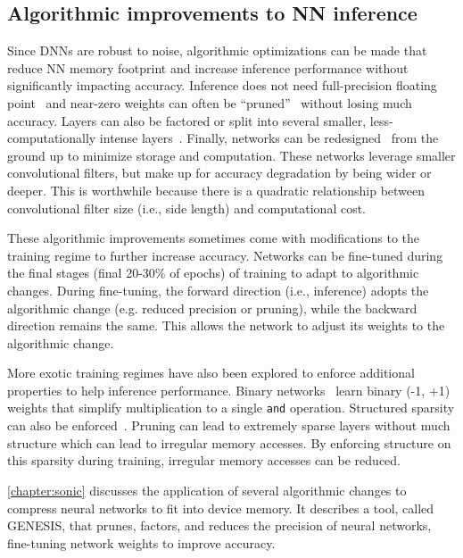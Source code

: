 \subsection{Algorithmic improvements to NN inference}
\label{chapter:background:inference:algorithm}
Since DNNs are robust to noise, algorithmic optimizations can be made that reduce NN memory footprint and increase inference performance without significantly impacting accuracy.
% 
Inference does not need full-precision floating point~\cite{han:isca16:eie,desa:isca17:sgd} and near-zero weights can often be ``pruned''~\cite{nabhan1994toward, han:iclr16:deep-compression,nakkiran:interspeech15:compressing,bhattacharya2016sparsification} without losing much accuracy.
% 
Layers can also be factored or split into several smaller, less-computationally intense layers~\cite{szegedy2017inception,szegedy2016rethinking,chollet2016xception}.
% 
Finally, networks can be redesigned~\cite{iandola:arxiv16:squeezenet,tan2019efficientnet,sandler2018mobilenetv2} from the ground up to minimize storage and computation.
% 
These networks leverage smaller convolutional filters, but make up for accuracy degradation by being wider or deeper.
% 
This is worthwhile because there is a quadratic relationship between convolutional filter size (i.e., side length) and computational cost.

These algorithmic improvements sometimes come with modifications to the training regime to further increase accuracy.
% 
Networks can be fine-tuned during the final stages (final 20-30\% of epochs) of training to adapt to algorithmic changes.
% 
During fine-tuning, the forward direction (i.e., inference) adopts the algorithmic change (e.g. reduced precision or pruning), while the backward direction remains the same.
% 
This allows the network to adjust its weights to the algorithmic change.

More exotic training regimes have also been explored to enforce additional properties to help inference performance.
% 
Binary networks~\cite{lin2018binary} learn binary (-1, +1) weights that simplify multiplication to a single {\tt and} operation.
% 
Structured sparsity can also be enforced~\cite{deng2018permdnn,nakkiran:interspeech15:compressing}.
% 
Pruning can lead to extremely sparse layers without much structure which can lead to irregular memory accesses.
% 
By enforcing structure on this sparsity during training, irregular memory accesses can be reduced.

\autoref{chapter:sonic} discusses the application of several algorithmic changes to compress neural networks to fit into device memory.
%
It describes a tool, called GENESIS, that prunes, factors, and reduces the precision of neural networks, fine-tuning network weights to improve accuracy.

